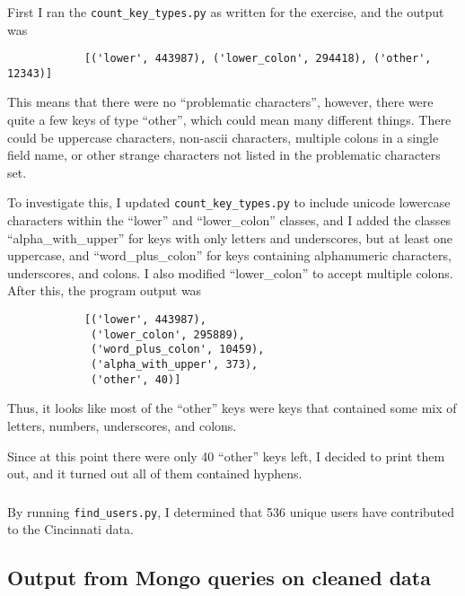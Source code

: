 \documentclass{article}
\begin{document}
            \subsubsection{}
            First I ran the \texttt{count\_key\_types.py} as written for the
            exercise, and the output was
            \begin{lstlisting}
            [('lower', 443987), ('lower_colon', 294418), ('other', 12343)]
            \end{lstlisting}
            This means that there were no ``problematic characters'', however,
            there were quite a few keys of type ``other'', which could mean many
            different things. There could be uppercase characters, non-ascii
            characters, multiple colons in a single field name, or other strange
            characters not listed in the problematic characters set.

            To investigate this, I updated \texttt{count\_key\_types.py} to
            include unicode lowercase characters within the ``lower'' and
            ``lower\_colon'' classes, and I added the classes
            ``alpha\_with\_upper'' for keys with only letters and underscores,
            but at least one uppercase, and ``word\_plus\_colon'' for keys
            containing alphanumeric characters, underscores, and colons. I also
            modified ``lower\_colon'' to accept multiple colons. After this, the
            program output was 
            \begin{lstlisting}
            [('lower', 443987),
             ('lower_colon', 295889),
             ('word_plus_colon', 10459),
             ('alpha_with_upper', 373),
             ('other', 40)]
            \end{lstlisting}
            Thus, it looks like most of the ``other'' keys were keys that
            contained some mix of letters, numbers, underscores, and colons.
            
            Since at this point there were only 40 ``other'' keys left, I
            decided to print them out, and it turned out all of them contained
            hyphens.

            \subsubsection{}
            By running \texttt{find\_users.py}, I determined that 536 unique
            users have contributed to the Cincinnati data.
        \subsection{Output from Mongo queries on cleaned data}
\end{document}
